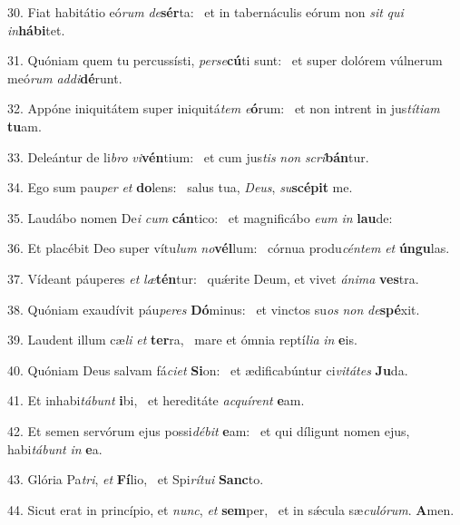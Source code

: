 30. Fiat habitátio eó\textit{rum} \textit{de}\textbf{sér}ta: \ast\  et in tabernáculis eórum non \textit{sit} \textit{qui} \textit{in}\textbf{há}\textbf{bi}tet.\

31. Quóniam quem tu percussísti, \textit{per}\textit{se}\textbf{cú}ti sunt: \ast\  et super dolórem vúlnerum meó\textit{rum} \textit{ad}\textit{di}\textbf{dé}runt.\

32. Appóne iniquitátem super iniquitá\textit{tem} \textit{e}\textbf{ó}rum: \ast\  et non intrent in jus\textit{tí}\textit{ti}\textit{am} \textbf{tu}am.\

33. Deleántur de li\textit{bro} \textit{vi}\textbf{vén}tium: \ast\  et cum jus\textit{tis} \textit{non} \textit{scri}\textbf{bán}tur.\

34. Ego sum pau\textit{per} \textit{et} \textbf{do}lens: \ast\  salus tua, \textit{De}\textit{us}, \textit{su}\textbf{scé}\textbf{pit} me.\

35. Laudábo nomen De\textit{i} \textit{cum} \textbf{cán}tico: \ast\  et magnificábo \textit{e}\textit{um} \textit{in} \textbf{lau}de:\

36. Et placébit Deo super vítu\textit{lum} \textit{no}\textbf{vél}lum: \ast\  córnua produ\textit{cén}\textit{tem} \textit{et} \textbf{ún}\textbf{gu}las.\

37. Vídeant páuperes \textit{et} \textit{læ}\textbf{tén}tur: \ast\  quǽrite Deum, et vivet \textit{á}\textit{ni}\textit{ma} \textbf{ves}tra.\

38. Quóniam exaudívit páu\textit{pe}\textit{res} \textbf{Dó}minus: \ast\  et vinctos su\textit{os} \textit{non} \textit{de}\textbf{spé}xit.\

39. Laudent illum cæ\textit{li} \textit{et} \textbf{ter}ra, \ast\  mare et ómnia reptí\textit{li}\textit{a} \textit{in} \textbf{e}is.\

40. Quóniam Deus salvam fá\textit{ci}\textit{et} \textbf{Si}on: \ast\  et ædificabúntur ci\textit{vi}\textit{tá}\textit{tes} \textbf{Ju}da.\

41. Et inhabi\textit{tá}\textit{bunt} \textbf{i}bi, \ast\  et hereditáte \textit{ac}\textit{quí}\textit{rent} \textbf{e}am.\

42. Et semen servórum ejus possi\textit{dé}\textit{bit} \textbf{e}am: \ast\  et qui díligunt nomen ejus, habi\textit{tá}\textit{bunt} \textit{in} \textbf{e}a.\

43. Glória Pa\textit{tri}, \textit{et} \textbf{Fí}lio, \ast\  et Spi\textit{rí}\textit{tu}\textit{i} \textbf{Sanc}to.\

44. Sicut erat in princípio, et \textit{nunc}, \textit{et} \textbf{sem}per, \ast\  et in sǽcula sæ\textit{cu}\textit{ló}\textit{rum}. \textbf{A}men.\

